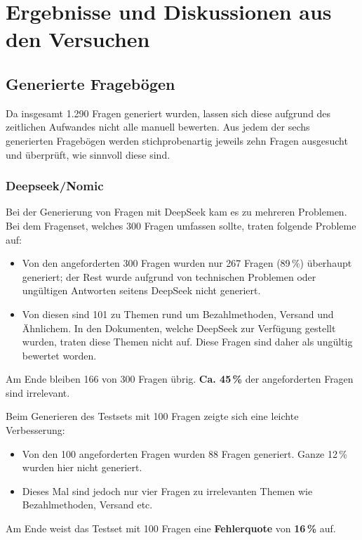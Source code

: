 \chapter{Ergebnisse und Diskussionen aus den Versuchen}



\section{Generierte Fragebögen}
Da insgesamt 1.290 Fragen generiert wurden, lassen sich diese aufgrund des zeitlichen Aufwandes nicht alle manuell bewerten. Aus jedem der sechs generierten Fragebögen werden stichprobenartig jeweils zehn Fragen ausgesucht und überprüft, wie sinnvoll diese sind.

\subsection{Deepseek/Nomic}

Bei der Generierung von Fragen mit DeepSeek kam es zu mehreren Problemen.
Bei dem Fragenset, welches 300 Fragen umfassen sollte, traten folgende Probleme auf:
\begin{itemize}
    \item Von den angeforderten 300 Fragen wurden nur 267 Fragen (89\,\%) überhaupt generiert; der Rest wurde aufgrund von technischen Problemen oder ungültigen Antworten seitens DeepSeek nicht generiert.
    \item Von diesen sind 101 zu Themen rund um Bezahlmethoden, Versand und Ähnlichem. In den Dokumenten, welche DeepSeek zur Verfügung gestellt wurden, traten diese Themen nicht auf. Diese Fragen sind daher als ungültig bewertet worden.
\end{itemize}

Am Ende bleiben 166 von 300 Fragen übrig. \textbf{Ca. 45\,\%} der angeforderten Fragen sind irrelevant.

Beim Generieren des Testsets mit 100 Fragen zeigte sich eine leichte Verbesserung:
\begin{itemize}
    \item Von den 100 angeforderten Fragen wurden 88 Fragen generiert. Ganze 12\,\% wurden hier nicht generiert.
    \item Dieses Mal sind jedoch nur vier Fragen zu irrelevanten Themen wie Bezahlmethoden, Versand etc.
\end{itemize}
Am Ende weist das Testset mit 100 Fragen eine \textbf{Fehlerquote} von \textbf{16\,\%} auf.

